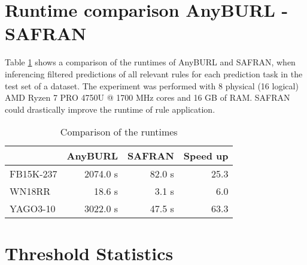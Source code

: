\documentclass[akbc,twoside,11pt,lettersize]{article}
\begin{document}
\section{Runtime comparison AnyBURL - SAFRAN}

Table \ref{runtimes} shows a comparison of the runtimes of AnyBURL and SAFRAN, when inferencing filtered predictions of all relevant rules for each prediction task in the test set of a dataset. The experiment was performed with 8 physical (16 logical) AMD Ryzen 7 PRO 4750U @ 1700 MHz cores and 16 GB of RAM. SAFRAN could drastically improve the runtime of rule application.

\begin{table}[H]
    \centering
    \begin{tabular}{lrrr}
         & AnyBURL & SAFRAN & Speed up \\ \hline
        FB15K-237 & 2074.0 s & 82.0 s & 25.3 \\
        WN18RR & 18.6 s & 3.1 s & 6.0 \\
        YAGO3-10 & 3022.0 s & 47.5 s & 63.3 \\ \hline
    \end{tabular}
    \caption{ Comparison of the runtimes }

    \label{runtimes}
\end{table}

\section{Threshold Statistics}
\end{document}
